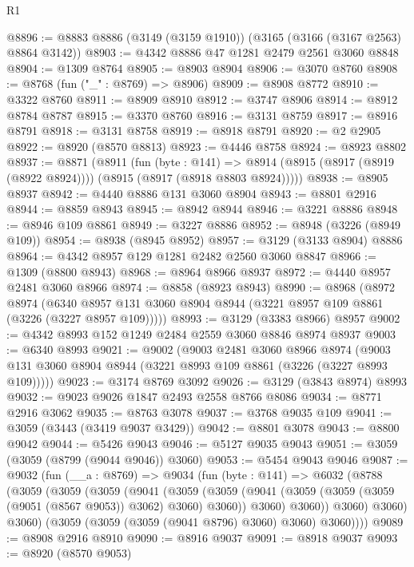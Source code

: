 \begin{lexlean}{R1}
\begin{coremodule}
@8896 := @8883 @8886 (@3149 (@3159 @1910)) (@3165 (@3166 (@3167 @2563) @8864 @3142))
@8903 := @4342 @8886 @47 @1281 @2479 @2561 @3060 @8848
@8904 := @1309 @8764
@8905 := @8903 @8904
@8906 := @3070 @8760
@8908 := @8768 (fun ("_" : @8769) => @8906)
@8909 := @8908 @8772
@8910 := @3322 @8760
@8911 := @8909 @8910
@8912 := @3747 @8906
@8914 := @8912 @8784 @8787
@8915 := @3370 @8760
@8916 := @3131 @8759
@8917 := @8916 @8791
@8918 := @3131 @8758
@8919 := @8918 @8791
@8920 := @2 @2905
@8922 := @8920 (@8570 @8813)
@8923 := @4446 @8758
@8924 := @8923 @8802
@8937 := @8871
    (@8911
      (fun (byte : @141) =>
      @8914 (@8915 (@8917 (@8919 (@8922 @8924)))) (@8915 (@8917 (@8918 @8803 @8924)))))
@8938 := @8905 @8937
@8942 := @4440 @8886 @131 @3060 @8904
@8943 := @8801 @2916
@8944 := @8859 @8943
@8945 := @8942 @8944
@8946 := @3221 @8886
@8948 := @8946 @109 @8861
@8949 := @3227 @8886
@8952 := @8948 (@3226 (@8949 @109))
@8954 := @8938 (@8945 @8952)
@8957 := @3129 (@3133 @8904) @8886
@8964 := @4342 @8957 @129 @1281 @2482 @2560 @3060 @8847
@8966 := @1309 (@8800 @8943)
@8968 := @8964 @8966 @8937
@8972 := @4440 @8957 @2481 @3060 @8966
@8974 := @8858 (@8923 @8943)
@8990 := @8968
    (@8972
      @8974
      (@6340 @8957 @131 @3060 @8904 @8944 (@3221 @8957 @109 @8861 (@3226 (@3227 @8957 @109)))))
@8993 := @3129 (@3383 @8966) @8957
@9002 := @4342 @8993 @152 @1249 @2484 @2559 @3060 @8846 @8974 @8937
@9003 := @6340 @8993
@9021 := @9002
    (@9003
      @2481
      @3060
      @8966
      @8974
      (@9003 @131 @3060 @8904 @8944 (@3221 @8993 @109 @8861 (@3226 (@3227 @8993 @109)))))
@9023 := @3174 @8769 @3092
@9026 := @3129 (@3843 @8974) @8993
@9032 := @9023 @9026 @1847 @2493 @2558 @8766 @8086
@9034 := @8771 @2916 @3062
@9035 := @8763 @3078
@9037 := @3768 @9035 @109
@9041 := @3059 (@3443 (@3419 @9037 @3429))
@9042 := @8801 @3078
@9043 := @8800 @9042
@9044 := @5426 @9043
@9046 := @5127 @9035 @9043
@9051 := @3059 (@3059 (@8799 (@9044 @9046)) @3060)
@9053 := @5454 @9043 @9046
@9087 := @9032
    (fun (__a : @8769) =>
    @9034
      (fun (byte : @141) =>
      @6032
        (@8788
          (@3059
            (@3059
              (@3059
                (@9041
                  (@3059
                    (@3059
                      (@9041 (@3059 (@3059 (@3059 (@9051 (@8567 @9053)) @3062) @3060) @3060))
                      @3060)
                    @3060))
                @3060)
              @3060)
            @3060)
          (@3059 (@3059 (@3059 (@9041 @8796) @3060) @3060) @3060))))
@9089 := @8908 @2916 @8910
@9090 := @8916 @9037
@9091 := @8918 @9037
@9093 := @8920 (@8570 @9053)

\end{coremodule}
\end{lexlean}
